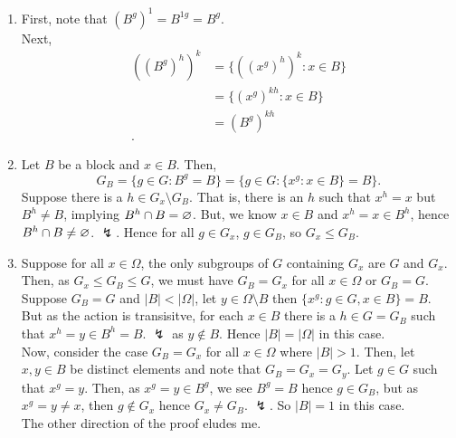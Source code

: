 \documentclass[a4paper]{article}
\begin{document}
\begin{solution}
\begin{enumerate}
	\item First, note that \(\left( B^{g} \right)^{1}  = B^{1g} = B^{g}\).\\
		Next,
		\begin{align*}
			\left( \left( B^{g} \right)^{h}  \right)^{k} &= \{\left( \left( x^{g} \right)^{h}  \right)^{k} : x \in B \} \\
								     &= \{\left( x^{g} \right)^{kh} : x \in B \}  \\
								     &= \left( B^{g} \right)^{kh}  \\
		.\end{align*}
		\item Let \(B\) be a block and \(x \in B\). Then, \[
		G_{B} = \{g \in G : B^{g} = B\} = \{g \in G : \{x^{g} : x \in B\} = B \}
		.\]
		Suppose there is a \(h \in G_{x} \setminus G_{B}\). That is, there is an \(h\) such that \(x^{h} = x\) but \(B^{h} \neq B\), implying \(B^{h} \cap B = \varnothing\). But, we know \(x \in B\) and \(x^{h} = x \in B^{h}\), hence \(B^{h} \cap B \neq \varnothing\). \(\lightning\). Hence for all \(g \in G_{x}\), \(g \in G_{B} \), so \(G_{x} \le G_{B}\).
	\item Suppose for all \(x \in \Omega\), the only subgroups of \(G\) containing \(G_{x}\) are \(G\) and \(G_{x}\). Then, as \(G_{x} \le G_{B} \le G\), we must have \(G_{B} = G_{x}\) for all \(x \in \Omega\) or \(G_{B} = G\). Suppose \(G_{B} = G\) and \(\left| B \right|  < \left| \Omega \right| \), let \(y \in \Omega \setminus B\) then \(\{x^{g} : g \in G, x \in B\} = B \). But as the action is transisitve, for each \(x \in B\) there is a \(h \in G = G_{B}\) such that \(x^{h} = y \in B^{h} = B\). \(\lightning\) as \(y \not\in B\). Hence \(\left| B \right| = \left| \Omega \right| \) in this case.\\
		Now, consider the case \(G_{B} = G_{x}\) for all \(x \in \Omega\) where \(\left| B \right|  > 1\). Then, let \(x, y \in B\) be distinct elements and note that \(G_{B} = G_{x} = G_{y}\). Let \(g \in G \) such that \(x^{g} = y\). Then, as \(x^{g} = y \in B^{g}\), we see \(B^{ g} = B\) hence \(g \in G_{B}\), but as \(x^{g} =y \neq x\), then \(g \not\in G_{x}\) hence \(G_{x} \neq G_{B}\). \(\lightning\). So \(\left| B \right|  =1\) in this case.\\
		The other direction of the proof eludes me.
\end{enumerate}
\end{solution}
\end{document}
